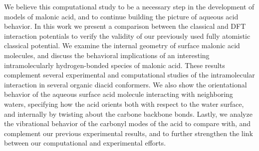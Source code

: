 We believe this computational study to be a necessary step in the development of models of malonic acid, and to continue building the picture of aqueous acid behavior. In this work we present a comparison between the classical and DFT interaction potentials to verify the validity of our previously used fully atomistic classical potential. We examine the internal geometry of surface malonic acid molecules, and discuss the behavioral implications of an interesting intramolecularly hydrogen-bonded species of malonic acid. These results complement several experimental and computational studies of the intramolecular interaction in several organic diacid conformers.\cite{Mohajeri2004,Dopieralski2011,Darvas2011,Nilsson1998,Chen2000,Eberson1959,Macoas2000,Macoas2000a,Merchan1984,Nguyen2005,Nieminen1992} We also show the orientational behavior of the aqueous surface acid molecule interacting with neighboring waters, specifying how the acid orients both with respect to the water surface, and internally by twisting about the carbone backbone bonds. Lastly, we analyze the vibrational behavior of the carbonyl modes of the acid to compare with, and complement our previous experimental results, and to further strengthen the link between our computational and experimental efforts.
